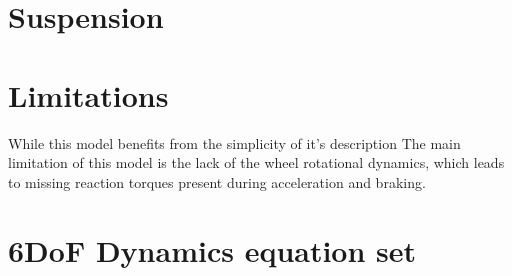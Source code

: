 \section{Suspension}
\label{sec:suspension}
\section{Limitations}
\label{sec:6doflimits}
While this model benefits from the simplicity of it's description
The main limitation of this model is the lack of the wheel rotational dynamics, which leads to missing reaction torques present during acceleration and braking.
\section{6DoF Dynamics equation set}
\label{sec:6dofeq}
